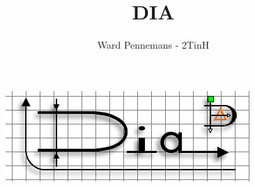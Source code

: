 \documentclass[12pt,a4paper]{report}
\begin{document}
\lhead{\leftmark}
\chead{}
\rhead{}
\cfoot{\thepage \hspace*{1pt} / \pageref{LastPage}}
\begin{figure}
\includegraphics[scale=1]{images/dia.png}
\vspace{-100pt} 
\end{figure}
\title{DIA}
\author{Ward Pennemans - 2TinH}
\maketitle
\thispagestyle{empty}
\end{document}
